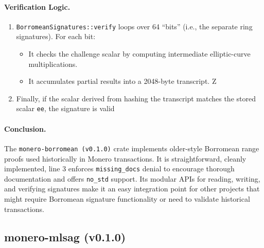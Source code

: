 \paragraph{Verification Logic.}
\begin{enumerate}[label=(\roman*)]
  \item \texttt{BorromeanSignatures::verify} loops over 64 “bits” (i.e., the separate ring signatures). For each bit: %
  \begin{itemize}
    \item It checks the challenge scalar by computing intermediate elliptic-curve multiplications. %
    \item It accumulates partial results into a 2048-byte transcript. Z%
  \end{itemize}
  \item Finally, if the scalar derived from hashing the transcript matches the stored scalar \texttt{ee}, the signature is valid %
\end{enumerate}

\paragraph{Conclusion.} 
The \texttt{monero-borromean (v0.1.0)} crate implements older-style Borromean range proofs used historically in Monero transactions.  It is straightforward, cleanly implemented, line 3 enforces \texttt{missing\_docs} denial to encourage thorough documentation and offers \texttt{no\_std} support.  Its modular APIs for reading, writing, and verifying signatures make it an easy integration point for other projects that might require Borromean signature functionality or need to validate historical transactions.




\subsection{monero-mlsag (v0.1.0)}


